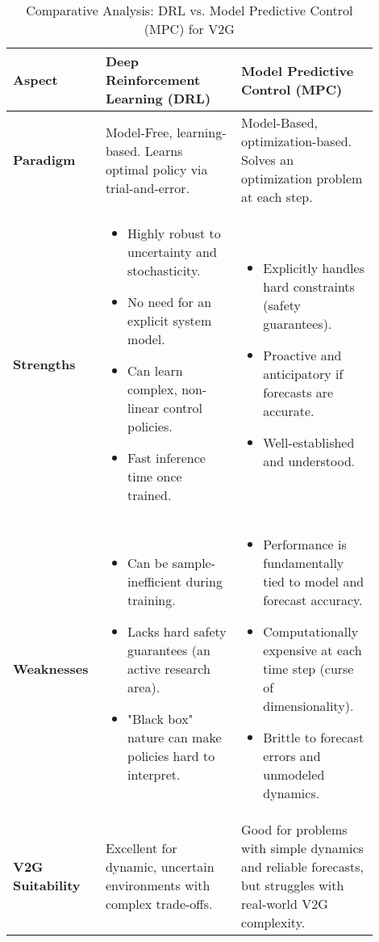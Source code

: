 \begin{table}[h!]
\centering
\caption{Comparative Analysis: DRL vs. Model Predictive Control (MPC) for V2G}
\label{tab:drl_vs_mpc}
\begin{tabular}{|p{0.2\linewidth}|p{0.35\linewidth}|p{0.35\linewidth}|}
\hline
\textbf{Aspect} & \textbf{Deep Reinforcement Learning (DRL)} & \textbf{Model Predictive Control (MPC)} \\
\hline
\textbf{Paradigm} & Model-Free, learning-based. Learns optimal policy via trial-and-error. & Model-Based, optimization-based. Solves an optimization problem at each step. \\
\hline
\textbf{Strengths} & \begin{itemize} \item Highly robust to uncertainty and stochasticity. \item No need for an explicit system model. \item Can learn complex, non-linear control policies. \item Fast inference time once trained. \end{itemize} & \begin{itemize} \item Explicitly handles hard constraints (safety guarantees). \item Proactive and anticipatory if forecasts are accurate. \item Well-established and understood. \end{itemize} \\
\hline
\textbf{Weaknesses} & \begin{itemize} \item Can be sample-inefficient during training. \item Lacks hard safety guarantees (an active research area). \item "Black box" nature can make policies hard to interpret. \end{itemize} & \begin{itemize} \item Performance is fundamentally tied to model and forecast accuracy. \item Computationally expensive at each time step (curse of dimensionality). \item Brittle to forecast errors and unmodeled dynamics. \end{itemize} \\
\hline
\textbf{V2G Suitability} & Excellent for dynamic, uncertain environments with complex trade-offs. & Good for problems with simple dynamics and reliable forecasts, but struggles with real-world V2G complexity. \\
\hline
\end{tabular}
\end{table}
